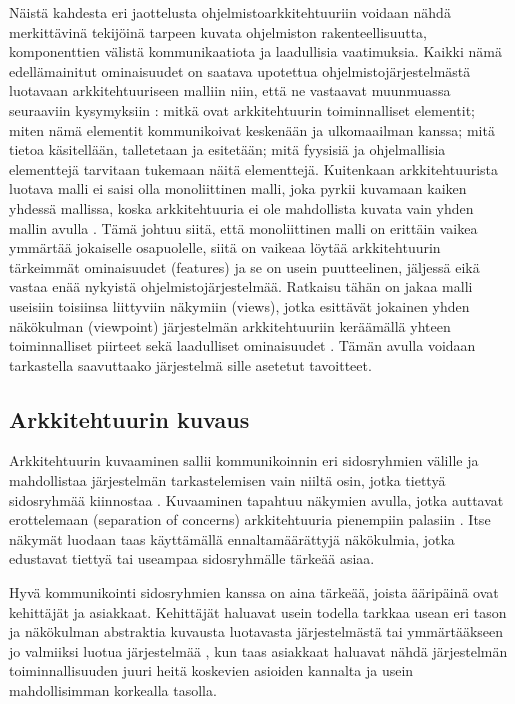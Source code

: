 \documentclass[finnish]{tktltiki2}
\theoremstyle{definition}
\theoremstyle{remark}
\begin{document}
Näistä kahdesta eri jaottelusta ohjelmistoarkkitehtuuriin voidaan nähdä merkittävinä tekijöinä tarpeen kuvata ohjelmiston rakenteellisuutta, komponenttien välistä kommunikaatiota ja laadullisia vaatimuksia. Kaikki nämä edellämainitut ominaisuudet on saatava  upotettua ohjelmistojärjestelmästä luotavaan arkkitehtuuriseen malliin niin, että ne vastaavat muunmuassa seuraaviin kysymyksiin \citep[s. 31 - 33]{Rozanski:2011:SSA:2072649}: mitkä ovat arkkitehtuurin toiminnalliset elementit; miten nämä elementit kommunikoivat keskenään ja ulkomaailman kanssa; mitä tietoa käsitellään, talletetaan ja esitetään; mitä fyysisiä ja ohjelmallisia elementtejä tarvitaan tukemaan näitä  elementtejä. Kuitenkaan arkkitehtuurista luotava malli ei saisi olla monoliittinen malli, joka pyrkii kuvamaan kaiken yhdessä mallissa, koska arkkitehtuuria ei ole mahdollista kuvata vain yhden mallin avulla \cite{Rozanski:2011:SSA:2072649}. Tämä johtuu siitä, että monoliittinen malli on erittäin vaikea ymmärtää jokaiselle osapuolelle, siitä on vaikeaa löytää arkkitehtuurin tärkeimmät ominaisuudet (features) ja se on usein puutteelinen, jäljessä eikä vastaa enää nykyistä ohjelmistojärjestelmää. Ratkaisu tähän on jakaa malli useisiin toisiinsa liittyviin näkymiin (views), jotka esittävät jokainen yhden näkökulman (viewpoint) järjestelmän arkkitehtuuriin keräämällä yhteen toiminnalliset piirteet sekä laadulliset ominaisuudet \citetext{\citealp[s. 33-34]{Rozanski:2011:SSA:2072649}; \citealp[s. 8-9]{gorton_understanding_2011}; \citealp[s. 117]{Ran:1998:ASV:288408.288438}}. Tämän avulla voidaan tarkastella saavuttaako järjestelmä sille asetetut tavoitteet.


\subsection{Arkkitehtuurin kuvaus}

Arkkitehtuurin kuvaaminen sallii kommunikoinnin eri sidosryhmien välille ja mahdollistaa järjestelmän tarkastelemisen vain niiltä osin, jotka tiettyä sidosryhmää kiinnostaa \citetext{\citealp[s. 329]{ARaHVeSCiSDu}; \citealp[s. 60]{Brondum:2010:TAV:1833335.1833344}}. Kuvaaminen tapahtuu näkymien avulla, jotka auttavat erottelemaan (separation of concerns) arkkitehtuuria pienempiin palasiin \citep[s. 2]{Galster:2011:DTC:2031759.2031761}. Itse näkymät luodaan taas käyttämällä ennaltamäärättyjä näkökulmia, jotka edustavat tiettyä tai useampaa sidosryhmälle tärkeää asiaa. 

Hyvä kommunikointi sidosryhmien kanssa on aina tärkeää, joista ääripäinä ovat kehittäjät ja asiakkaat. Kehittäjät haluavat usein todella tarkkaa usean eri tason ja näkökulman abstraktia kuvausta luotavasta järjestelmästä \citep[s. 120]{Ran:1998:ASV:288408.288438} tai ymmärtääkseen jo valmiiksi luotua järjestelmää \cite{ARaHVeSCiSDu}, kun taas asiakkaat haluavat nähdä järjestelmän toiminnallisuuden juuri heitä koskevien asioiden kannalta ja usein mahdollisimman korkealla tasolla.
\end{document}
